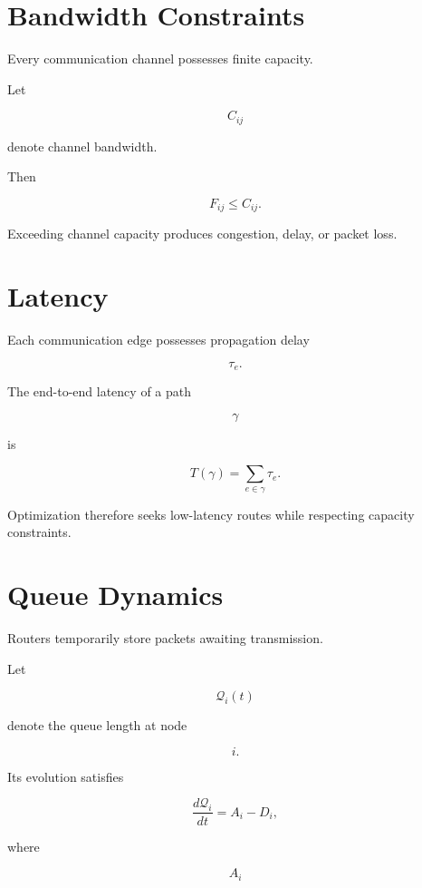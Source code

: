 \documentclass[11pt,fleqn]{book}
\numberwithin{equation}{chapter}
\theoremstyle{plain}
\theoremstyle{definition}
\theoremstyle{remark}
\begin{document}

\section{Bandwidth Constraints}

Every communication channel possesses finite capacity.

Let

\[
C_{ij}
\]

denote channel bandwidth.

Then

\[
\boxed{
F_{ij}
\le
C_{ij}.
}
\]

Exceeding channel capacity produces congestion,
delay,
or packet loss.


\section{Latency}

Each communication edge possesses propagation delay

\[
\tau_e.
\]

The end-to-end latency of a path

\[
\gamma
\]

is

\[
\boxed{
T(\gamma)
=
\sum_{e\in\gamma}
\tau_e.
}
\]

Optimization therefore seeks low-latency routes while respecting
capacity constraints.


\section{Queue Dynamics}

Routers temporarily store packets awaiting transmission.

Let

\[
\mathcal Q_i(t)
\]

denote the queue length at node

\[
i.
\]

Its evolution satisfies

\[
\boxed{
\frac{d\mathcal Q_i}{dt}
=
A_i
-
D_i,
}
\]

where

\[
A_i
\]
\end{document}
